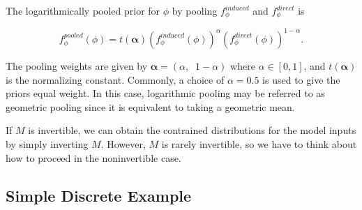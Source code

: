 \documentclass[12pt,twoside]{smiththesis}
\begin{document}
The logarithmically pooled prior for \(\phi\) by pooling \(f_\phi^{induced}\) and \(f_\phi^{direct}\) is

\[f_\phi^{pooled} (\phi) = t(\boldsymbol{\alpha}) (f_\phi^{induced}(\phi))^{\alpha} (f_\phi^{direct}(\phi))^{1-\alpha}.\]

The pooling weights are given by \(\boldsymbol{\alpha} = (\alpha, \;\;1-\alpha)\) where \(\alpha \in [0,1]\), and \(t(\boldsymbol{\alpha})\) is the normalizing constant. Commonly, a choice of \(\alpha = 0.5\) is used to give the priors equal weight. In this case, logarithmic pooling may be referred to as geometric pooling since it is equivalent to taking a geometric mean.

If \(M\) is invertible, we can obtain the contrained distributions for the model inputs by simply inverting \(M\). However, \(M\) is rarely invertible, so we have to think about how to proceed in the noninvertible case.

\hypertarget{simple-discrete-example}{%
\subsection{Simple Discrete Example}\label{simple-discrete-example}}
\end{document}

